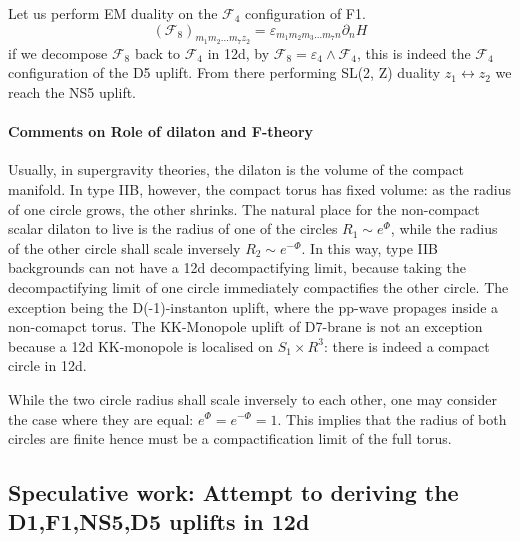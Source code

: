 Let us perform EM duality on the $\mathcal{F}_4$ configuration of F1.
\begin{equation}
(\mathcal{F}_8)_{m_1 m_2 ...m_7 z_2} = \varepsilon_{m_1 m_2 m_3 ... m_7 n}\partial_n H
\end{equation}
if we decompose $\mathcal{F}_8$ back to $\mathcal{F}_4$ in 12d, by $\mathcal{F}_8 = \varepsilon_4 \wedge \mathcal{F}_4$, this is indeed the $\mathcal{F}_4$ configuration of the D5 uplift. From there performing SL(2, Z) duality $z_1 \leftrightarrow z_2$ we reach the NS5 uplift.

\paragraph{Comments on Role of dilaton and F-theory}
Usually, in supergravity theories, the dilaton is the volume of the compact manifold.
In type IIB, however, the compact torus has fixed volume: as the radius of one circle grows, the other shrinks.
The natural place for the non-compact scalar dilaton to live is the radius of one of the circles $R_1 \sim e^{\Phi}$, while the radius of the other circle shall scale inversely $R_2 \sim e^{-\Phi}$.
In this way, type IIB backgrounds can not have a 12d decompactifying limit, because taking the decompactifying limit of one circle immediately compactifies the other circle. 
The exception being the D(-1)-instanton uplift, where the pp-wave propages inside a non-comapct torus.
The KK-Monopole uplift of D7-brane is not an exception because a 12d KK-monopole is localised on $S_1 \times R^3$: there is indeed a compact circle in 12d.

While the two circle radius shall scale inversely to each other, one may consider the case where they are equal: $e^\Phi = e^{-\Phi} = 1$.
This implies that the radius of both circles are finite hence must be a compactification limit of the full torus.



\subsection{Speculative work: Attempt to deriving the D1,F1,NS5,D5 uplifts in 12d}

